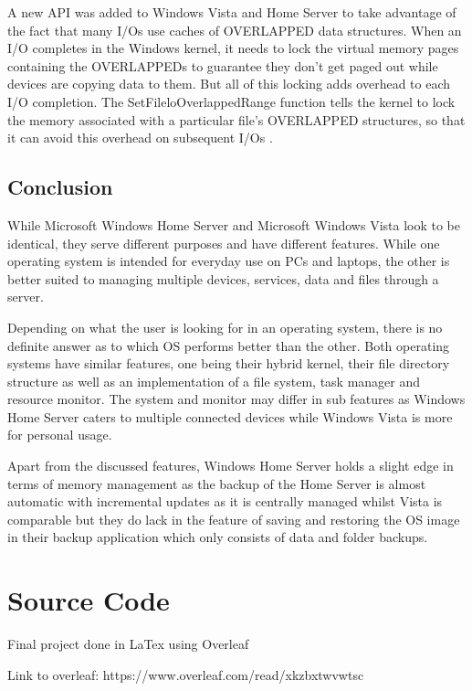 \documentclass[a4paper, 12pt]{article}
\begin{document}
A new API was added to Windows Vista and Home Server to take advantage of the fact that many I/Os use caches of OVERLAPPED data structures. When an I/O completes in the Windows kernel, it needs to lock the virtual memory pages containing the OVERLAPPEDs to guarantee they don't get paged out while devices are copying data to them. But all of this locking adds overhead to each I/O completion. The SetFileloOverlappedRange function tells the kernel to lock the memory associated with a particular file's OVERLAPPED structures, so that it can avoid this overhead on subsequent I/Os \parencite{al12concurrent}.

\subsection{Conclusion}
While Microsoft Windows Home Server and Microsoft Windows Vista look to be identical, they serve different purposes and have different features. While one operating system is intended for everyday use on PCs and laptops, the other is better suited to managing multiple devices, services, data and files through a server.

Depending on what the user is looking for in an operating system, there is no definite answer as to which OS performs better than the other. Both operating systems have similar features, one being their hybrid kernel, their file directory structure as well as an implementation of a file system, task manager and resource monitor. The system and monitor may differ in sub features as Windows Home Server caters to multiple connected devices while Windows Vista is more for personal usage.

Apart from the discussed features, Windows Home Server holds a slight edge in terms of memory management as the backup of the Home Server is almost automatic with incremental updates as it is centrally managed whilst Vista is comparable but they do lack in the feature of saving and restoring the OS image in their backup application which only consists of data and folder backups.

\newpage
\section{Source Code}
Final project done in LaTex using Overleaf

Link to overleaf: https://www.overleaf.com/read/xkzbxtwvwtsc

\newpage
\nocite{*} \printbibliography[heading=bibintoc,title={References}]{}
\end{document}
